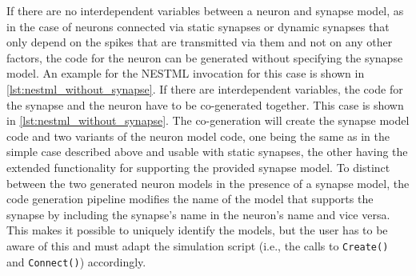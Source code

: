 If there are no interdependent variables between a neuron and synapse model, as in the case of neurons connected via static synapses or dynamic synapses that only depend on the spikes that are transmitted via them and not on any other factors, the code for the neuron can be generated without specifying the synapse model. An example for the NESTML invocation for this case is shown in \autoref{lst:nestml_without_synapse}. If there are interdependent variables, the code for the synapse and the neuron have to be co-generated together. This case is shown in \autoref{lst:nestml_without_synapse}. The co-generation will create the synapse model code and two variants of the neuron model code, one being the same as in the simple case described above and usable with static synapses, the other having the extended functionality for supporting the provided synapse model. To distinct between the two generated neuron models in the presence of a synapse model, the code generation pipeline modifies the name of the model that supports the synapse by including the synapse's name in the neuron's name and vice versa. This makes it possible to uniquely identify the models, but the user has to be aware of this and must adapt the simulation script (i.e., the calls to \texttt{Create()} and \texttt{Connect()}) accordingly.

